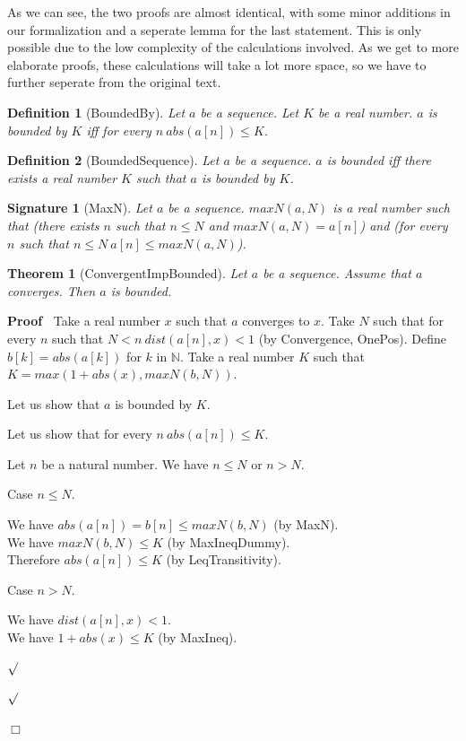 \documentclass{article}
\newenvironment{forthel}{\begin{leftbar}}{\end{leftbar}}
\newenvironment{proof}{\noindent\textbf{Proof\ }}{\hspace*{\fill}$\Box$\medskip}
\newenvironment{subproof}{\begin{list}{}{}
		\item[\text{Proof}]}{\hfill $\surd$ \end{list}}
\newenvironment{case}{\begin{list}{}{}
		\item[]}{\end{list}}
\newtheorem{theorem}{Theorem}
\newtheorem{definition}{Definition}
\newtheorem{signature}{Signature}
\newcommand{\NN}{\mathbb{N}}
\begin{document}
\noindent As we can see, the two proofs are almost identical, with some minor additions in our formalization and a seperate lemma for the last statement. This is only possible due to the low complexity of the calculations involved. As we get to more elaborate proofs, these calculations will take a lot more space, so we have to further seperate from the original text.

\begin{forthel}
	\begin{definition}[BoundedBy]
		Let $a$ be a sequence. Let $K$ be a real number. $a$ is bounded by $K$ iff
		for every $n \ abs(a[n]) \leq K$.
	\end{definition}
	
	\begin{definition}[BoundedSequence]
		Let $a$ be a sequence. $a$ is bounded iff there exists a real number $K$ such that
		$a$ is bounded by $K$.
	\end{definition}
	
	\begin{signature}[MaxN]
		Let $a$ be a sequence. $maxN(a,N)$ is a real number such that
		(there exists $n$ such that $n \leq N$ and $maxN(a,N) = a[n]$) and
		(for every $n$ such that $n \leq N \ a[n] \leq maxN(a,N)$).
	\end{signature}
	
	\begin{theorem}[ConvergentImpBounded]
		Let $a$ be a sequence. Assume that $a$ converges. Then $a$ is bounded.
	\end{theorem}

	\begin{proof}
		Take a real number $x$ such that $a$ converges to $x$.
		Take $N$ such that for every $n$ such that $N < n \ dist(a[n],x) < 1$ (by Convergence, OnePos).
		Define $b[k] = abs(a[k])$ for $k$ in $\NN$.
		Take a real number $K$ such that \linebreak $K = max(1 + abs(x), maxN(b,N))$.
		
		\noindent Let us show that $a$ is bounded by $K$.
		\begin{subproof}
			Let us show that for every $n \ abs(a[n]) \leq K$.
			\begin{subproof} 
				Let $n$ be a natural number.
				We have $n \leq N$ or $n > N$.
				
				Case $n \leq N$.
				\begin{case}
					We have $abs(a[n]) = b[n] \leq maxN(b,N)$ (by MaxN).\\
					We have $maxN(b,N) \leq K$ (by MaxIneqDummy).\\
					Therefore $abs(a[n]) \leq K$ (by LeqTransitivity).
				\end{case}
				Case $n > N$.
				\begin{case}
					We have $dist(a[n],x) < 1$.\\
					We have $1 + abs(x) \leq K$ (by MaxIneq).
					

\end{case}
\end{subproof}
\end{subproof}
\end{proof}
\end{forthel}
\end{document}
